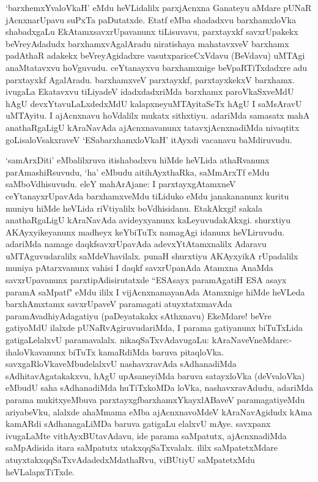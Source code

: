 \begin{artha}%
`barxhemxYvaloVkaH' eMdu heVLidalilx parxjAcnxna Ganateyu aMdare pUNaR jAcnxnarUpavu suPxTa paDutatxde. Etatf eMba shadadxvu barxhamxloVka shabadxgaLu EkAtamxsavxrUpavanunx tiLisuvavu, parxtayxkf savxrUpakekx beVreyAdadudx barxhamxvAgalAradu niratishaya mahatavxveV barxhamx padAthaR adakekx beVreyAgidadxre vasutxpariceCxVdavu (BeVdavu) uMTAgi anaMtatavxvu hoVguvudu. ceYtanayxvu barxhamxnige beVpaRTiTxdadxre adu parxtayxkf AgalAradu. barxhamxveV parxtayxkf, parxtayxkekxV barxhamx. ivugaLa Ekatavxvu tiLiyadeV idadxdadxriMda barxhamx paroVkaSxveMdU hAgU devxYtavuLaLxdedxMdU kalapxneyuMTAyitaSeTx hAgU I saMsAravU uMTAyitu. I ajAcnxnavu hoVdalilx mukatx sithxtiyu. adariMda samasatx mahA anathaRgaLigU kAraNavAda ajAcnxnavanunx tatavxjAcnxnadiMda nivaqtitx goLisaloVsakxraveV `ESabarxhamxloVkaH' itAyxdi vacanavu baMdiruvudu. 
\end{artha}

\begin{artha}
`samArxDiti' eMbalilxruva itishabadxvu hiMde heVLida athaRvanunx parAmashiRsuvudu, `ha' eMbudu aitihAyxthaRka, saMmArxTf eMdu saMboVdhisuvudu. eleY mahArAjane: I parxtayxgAtamxneV ceYtanayxrUpavAda barxhamxveMdu tiLiduko eMdu janakananunx kuritu muniyu hiMde heVLida riVtiyalilx boVdhisidanu. EtakAkxgi! sakala anathaRgaLigU kAraNavAda avideyxyanunx kaLeyuvudakAkxgi. shurxtiyu AKAyxyikeyanunx madheyx keYbiTuTx namagAgi idanunx heVLiruvudu. adariMda namage daqkfsavxrUpavAda adevxYtAtamxnalilx Adaravu uMTAguvudaralilx saMdeVhavilalx. punaH shurxtiyu AKAyxyikA rUpadalilx muniya pAtarxvanunx vahisi I daqkf savxrUpanAda Atamxna AnaMda savxrUpavanunx parxtipAdisirutatxde ``ESAsayx paramAgatiH ESA asayx paramA saMpatf" eMdu ililx I vijAcnxnamayanAda Atamxnige hiMde heVLeda barxhAmxtamx savxrUpaveV paramagati atuyxtatxmavAda paramAvadhiyAdagatiyu (paDeyatakakx sAthxnavu) EkeMdare! beVre gatiyoMdU ilalxde pUNaRvAgiruvudariMda, I parama gatiyanunx biTuTxLida gatigaLelalxvU paramavalalx. nikaqSaTxvAdavugaLu: kAraNaveVneMdare:- ihaloVkavanunx biTuTx kamaRdiMda baruva pitaqloVka. savxgaRloVkaveMbudelalxvU nashavxravAda sAdhanadiMda sAdhitavAgatakakxvu, hAgU upAsaneyiMda baruva satayxloVka (deVvaloVka) eMbudU saha sAdhanadiMda huTiTxkoMDa loVka, nashavxravAdudu, adariMda parama mukitxyeMbuva parxtayxgfbarxhamxYkayxlABaveV paramagatiyeMdu ariyabeVku, alalxde ahaMmama eMba ajAcnxnavoMdeV kAraNavAgidudx kAma kamARdi sAdhanagaLiMDa baruva gatigaLu elalxvU mAye. savxpanx ivugaLaMte vithAyxBUtavAdavu, ide parama saMpatutx, ajAcnxnadiMda saMpAdisida itara saMpatutx utakxqqSaTxvalalx. ililx saMpatetxMdare atuyxtakxqqSaTxvAdadedxMdathaRvu, viBUtiyU saMpatetxMdu heVLalapxTiTxde. 
\end{artha}%

